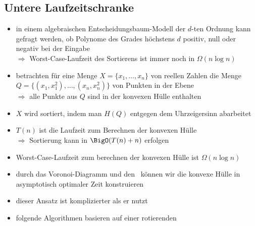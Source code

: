 \subsection{Untere Laufzeitschranke}
\begin{itemize}[itemsep=0pt]
	\item in einem algebraischen Entscheidungsbaum-Modell der $d$-ten Ordnung kann gefragt werden, ob Polynome des Grades höchstens $d$ positiv, null oder negativ bei der Eingabe\\
		$\Rightarrow$ Worst-Case-Laufzeit des Sortierens ist immer noch in $\Omega(n\log n)$
	\item betrachten für eine Menge $X=\{x_1,\dots,x_n\}$ von reellen Zahlen die Menge $Q=\{(x_1,x_1^2),\dots,(x_n,x_n^2)\}$ von Punkten in der Ebene\\
		$\Rightarrow $ alle Punkte aus $Q$ sind in der konvexen Hülle enthalten
	\item $X$ wird sortiert, indem man $H(Q)$ entgegen dem Uhrzeigersinn abarbeitet
	\item $T(n)$ ist die Laufzeit zum Berechnen der konvexen Hülle\\
		$\Rightarrow$ Sortierung kann in $\BigO(T(n)+n)$ erfolgen
	\item Worst-Case-Laufzeit zum berechnen der konvexen Hülle ist $\Omega(n\log n)$
	\item durch das Voronoi-Diagramm und den \dg~können wir die konvexe Hülle in asymptotisch optimaler Zeit konstruieren
	\item dieser Ansatz ist komplizierter als er nutzt
	\item folgende Algorithmen basieren auf einer rotierenden \sweep
\end{itemize}